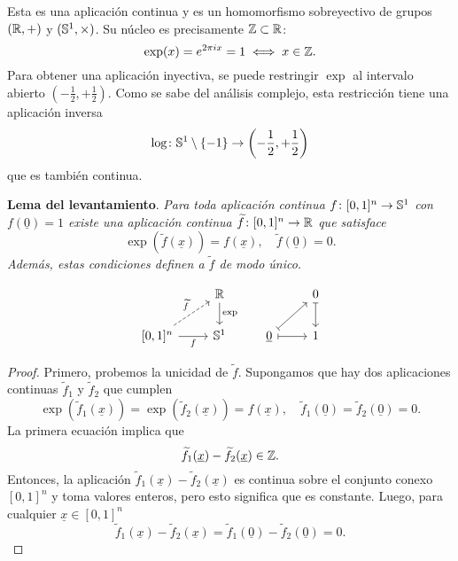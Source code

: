 \documentclass{article}
\numberwithin{equation}{section}
\begin{document}
Esta es una aplicación continua y es un homomorfismo sobreyectivo de grupos
$(\mathbb{R},+)$ y $(\mathbb{S}^1,\times)$. Su núcleo es precisamente $\mathbb{Z} \subset \mathbb{R}$:
$$\exp (x) = e^{2\pi i x} = 1 \iff x \in \mathbb{Z}.$$
Para obtener una aplicación inyectiva, se puede restringir $\exp$ al intervalo
abierto $\left(-\frac{1}{2}, +\frac{1}{2}\right)$. Como se sabe del análisis
complejo, esta restricción tiene una aplicación inversa
$$\log\colon \mathbb{S}^1 \setminus \{ -1 \} \to \left(-\frac{1}{2}, +\frac{1}{2}\right)$$
que es también continua.

\begin{nameless}\textbf{Lema del levantamiento}.
  \label{lema-del-levantamiento}
  \emph{Para toda aplicación continua $f\colon [0,1]^n \to \mathbb{S}^1$ con
    $f (\underline{0}) = 1$ existe una aplicación continua
    $\widetilde{f}\colon [0,1]^n \to \mathbb{R}$ que satisface
    $$\exp (\widetilde{f} (\underline{x})) = f (\underline{x}), \quad \widetilde{f} (\underline{0}) = 0.$$
    Además, estas condiciones definen a $\widetilde{f}$ de modo único.}

  \[ \begin{tikzcd}
      & \RR \ar{d}{\exp} && 0\ar[|->]{d} \\
      {[0,1]^n}\ar{r}[swap]{f}\ar[dashed]{ur}{\widetilde{f}} & \SS^1 & \underline{0} \ar[|->]{r}\ar[|->]{ur} & 1
    \end{tikzcd} \]

  \begin{proof}
    Primero, probemos la unicidad de $\widetilde{f}$. Supongamos que hay dos
    aplicaciones continuas $\widetilde{f}_1$ y $\widetilde{f}_2$ que cumplen
    \[ \exp (\widetilde{f}_1 (\underline{x})) = \exp (\widetilde{f}_2 (\underline{x})) = f (\underline{x}), \quad
      \widetilde{f}_1 (\underline{0}) = \widetilde{f}_2 (\underline{0}) = 0. \]
    La primera ecuación implica que
    $$\widetilde{f}_1 (\underline{x}) - \widetilde{f}_2 (\underline{x}) \in \mathbb{Z}.$$
    Entonces, la aplicación
    $\widetilde{f}_1 (\underline{x}) - \widetilde{f}_2 (\underline{x})$ es
    continua sobre el conjunto conexo $[0,1]^n$ y toma valores enteros, pero
    esto significa que es constante. Luego, para cualquier
    $\underline{x} \in [0,1]^n$
    $$\widetilde{f}_1 (\underline{x}) - \widetilde{f}_2 (\underline{x}) = \widetilde{f}_1 (\underline{0}) - \widetilde{f}_2 (\underline{0}) = 0.$$

    \vspace{1em}


\end{proof}
\end{nameless}
\end{document}
